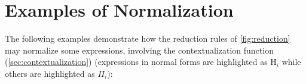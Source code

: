 
\newpage
\section{Examples of Normalization}
\label{app:normalization-examples}

\newcommand\exmp[1]{%
    \stepcounter{exmp}%
    e_\text{%
        \scshape #1%
    } =
}

The following examples demonstrate how the reduction rules of \cref{fig:reduction} may normalize
some expressions, involving the contextualization function (\cref{sec:contextualization})
(expressions in normal forms are highlighted as \(\mathrm{H}_i\) while others are
highlighted as \(\Pi_i\)):

